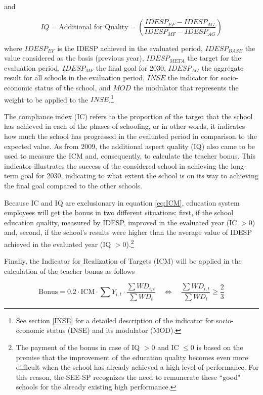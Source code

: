 \documentclass[a4paper, 12pt]{article}
\begin{document}
and 

\begin{equation} \label{eq:AQ}
IQ = \text{Additional for Quality} = \left( \frac{IDESP_{EF} - IDESP_{AG}}{IDESP_{MF} - IDESP_{AG}} \right)
\end{equation}
 

where $IDESP_{EF}$ is the IDESP achieved in the evaluated period, $IDESP_{BASE}$ the value considered as the basis (previous year), $IDESP_{META}$ the target for the evaluation period, $IDESP_{MF}$ the final goal for 2030, $IDESP_{AG}$ the aggregate result for all schools in the evaluation period, $INSE$ the indicator for socio-economic status of the school, and $MOD$ the modulator that represents the weight to be applied to the $INSE$.\footnote{See section \ref{INSE} for a detailed description of the indicator for socio-economic status (INSE) and its modulator (MOD).}


The compliance index (IC) refers to the proportion of the target that the school has achieved in each of the phases of schooling, or in other words, it indicates how much the school has progressed in the evaluated period in comparison to the expected value. As from 2009, the additional aspect quality (IQ) also came to be used to measure the ICM and, consequently, to calculate the teacher bonus. This indicator illustrates the success of the considered school in achieving the long-term goal for 2030, indicating to what extent the school is on its way to achieving the final goal compared to the other schools.

Because IC and IQ are exclusionary in equation \eqref{eq:ICM}, education system employees will get the bonus in two different situations: first, if the school education quality, measured by IDESP, improved in the evaluated year (IC $> 0$) and, second, if the school’s results were higher than the average value of IDESP achieved in the evaluated year (IQ $>0$).\footnote{The payment of the bonus in case of IQ $>0$ and IC $\leq 0$ is based on the premise that the improvement of the education quality becomes even more difficult when the school has already achieved a high level of performance. For this reason, the SEE-SP recognizes the need to remunerate these ``good" schools for the already existing high performance.}

Finally, the Indicator for Realization of Targets (ICM) will be applied in the calculation of the teacher bonus as follows

\begin{equation} \label{eq:Bonus}
\text{Bonus} = 0.2 \cdot \text{ICM} \cdot \sum Y_{i,t} \cdot \frac{\sum WD_{i,t}}{\sum WD_{t}} \quad \iff \quad \frac{\sum WD_{i,t}}{\sum WD_{t}} \geq \frac{2}{3}
\end{equation}
\end{document}
